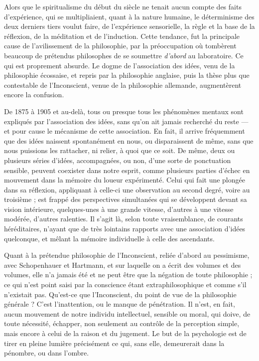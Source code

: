 \documentclass[french,twoside]{book} %
\begin{document}
Alors que le spiritualisme du début du siècle ne tenait aucun compte des faits d’expérience, qui se multipliaient, quant à la nature humaine, le déterminisme des deux derniers tiers voulut faire, de l’expérience sensorielle, la règle et la base de la réflexion, de la méditation et de l’induction. Cette tendance, fut la principale cause de l’avilissement de la philosophie, par la préoccupation où tombèrent beaucoup de prétendus philosophes de se soumettre {\itshape d’abord} au laboratoire. Ce qui est proprement absurde. Le dogme de l’association des idées, venu de la philosophie écossaise, et repris par la philosophie anglaise, puis la thèse plus que contestable de l’Inconscient, venue de la philosophie allemande, augmentèrent encore la confusion.\par
De 1875 à 1905 et au-delà, tous ou presque tous les phénomènes mentaux sont expliqués par l’association des idées, sans qu’on ait jamais recherché du reste — et pour cause le mécanisme de cette association. En fait, il arrive fréquemment que des idées naissent spontanément en nous, ou disparaissent de même, sans que nous puissions les rattacher, ni relier, à quoi que ce soit. De même, deux ou plusieurs séries d’idées, accompagnées, ou non, d’une sorte de ponctuation sensible, peuvent coexister dans notre esprit, comme plusieurs parties d’échec en mouvement dans la mémoire du loueur expérimenté. Celui qui fait une plongée dans sa réflexion, appliquant à celle-ci une observation au second degré, voire au troisième ; est frappé des perspectives simultanées qui se développent devant sa vision intérieure, quelques-unes à une grande vitesse, d’autres à une vitesse modérée, d’autres ralenties. Il s’agit là, selon toute vraisemblance, de courants héréditaires, n’ayant que de très lointains rapports avec une association d’idées quelconque, et mêlant la mémoire individuelle à celle des ascendants.\par
Quant à la prétendue philosophie de l’Inconscient, reliée d’abord au pessimisme, avec Schopenhauer et Hartmann, et sur laquelle on a écrit des volumes et des volumes, elle n’a jamais été et ne peut être que la négation de toute philosophie ; ce qui n’est point saisi par la conscience étant extraphilosophique et comme s’il n’existait pas. Qu’est-ce que l’Inconscient, du point de vue de la philosophie générale ? C’est l’inattention, ou le manque de pénétration. Il n’est, en fait, aucun mouvement de notre individu intellectuel, sensible ou moral, qui doive, de toute nécessité, échapper, non seulement au contrôle de la perception simple, mais encore à celui de la raison et du jugement. Le but de la psychologie est de tirer en pleine lumière précisément ce qui, sans elle, demeurerait dans la pénombre, ou dans l’ombre.\par
\end{document}
